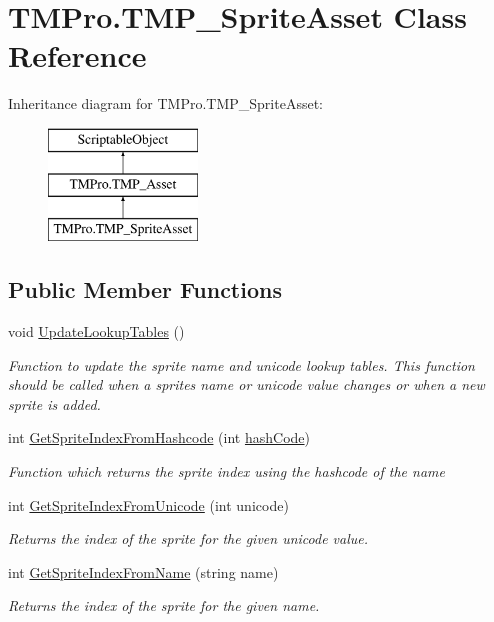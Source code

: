 \hypertarget{class_t_m_pro_1_1_t_m_p___sprite_asset}{}\section{T\+M\+Pro.\+T\+M\+P\+\_\+\+Sprite\+Asset Class Reference}
\label{class_t_m_pro_1_1_t_m_p___sprite_asset}
Inheritance diagram for T\+M\+Pro.\+T\+M\+P\+\_\+\+Sprite\+Asset\+:\begin{figure}[H]
\begin{center}
\leavevmode
\includegraphics[height=3.000000cm]{class_t_m_pro_1_1_t_m_p___sprite_asset}
\end{center}
\end{figure}
\subsection*{Public Member Functions}
\begin{DoxyCompactItemize}
\item 
void \mbox{\hyperlink{class_t_m_pro_1_1_t_m_p___sprite_asset_ac0d576c7ae191d74887684c5388ca32a}{Update\+Lookup\+Tables}} ()
\begin{DoxyCompactList}\small\item\em Function to update the sprite name and unicode lookup tables. This function should be called when a sprite\textquotesingle{}s name or unicode value changes or when a new sprite is added. \end{DoxyCompactList}\item 
int \mbox{\hyperlink{class_t_m_pro_1_1_t_m_p___sprite_asset_a9913527431a09b1d82e42f8365b2533c}{Get\+Sprite\+Index\+From\+Hashcode}} (int \mbox{\hyperlink{class_t_m_pro_1_1_t_m_p___asset_a63f177ff7028859d2b431789737d8ccc}{hash\+Code}})
\begin{DoxyCompactList}\small\item\em Function which returns the sprite index using the hashcode of the name \end{DoxyCompactList}\item 
int \mbox{\hyperlink{class_t_m_pro_1_1_t_m_p___sprite_asset_ae038e36239dc860b452fca1abd8284ef}{Get\+Sprite\+Index\+From\+Unicode}} (int unicode)
\begin{DoxyCompactList}\small\item\em Returns the index of the sprite for the given unicode value. \end{DoxyCompactList}\item 
int \mbox{\hyperlink{class_t_m_pro_1_1_t_m_p___sprite_asset_afa0139e3dcab964f9cfcf1fc634caad2}{Get\+Sprite\+Index\+From\+Name}} (string name)
\begin{DoxyCompactList}\small\item\em Returns the index of the sprite for the given name. \end{DoxyCompactList}\end{DoxyCompactItemize}
